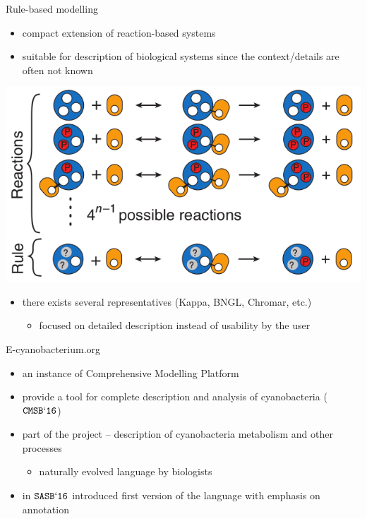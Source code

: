 \documentclass[10pt]{beamer}
\begin{document}
\begin{frame}[fragile]{Rule-based modelling}

\begin{itemize}
	\item compact extension of reaction-based systems
	\item suitable for description of biological systems since the context/details are often not known
\end{itemize}

\begin{center}
\includegraphics[scale=0.35]{pics/reaction_vs_rule.png}
\end{center}

\begin{itemize}
	\item there exists several representatives (Kappa, BNGL, Chromar, etc.)
	\begin{itemize}
		\item focused on detailed description instead of usability by the user 
	\end{itemize}
\end{itemize}

\end{frame}


\begin{frame}[fragile]{E-cyanobacterium.org}

\begin{itemize}
	\item an instance of Comprehensive Modelling Platform
	\item provide a tool for complete description and analysis of cyanobacteria ($\mathtt{CMSB`16}$)
	\item part of the project -- description of cyanobacteria metabolism and other processes
	\begin{itemize}
		\item naturally evolved language by biologists
	\end{itemize}
	\item in $\mathtt{SASB`16}$ introduced first version of the language with emphasis on annotation
\end{itemize}

\end{frame}
\end{document}
